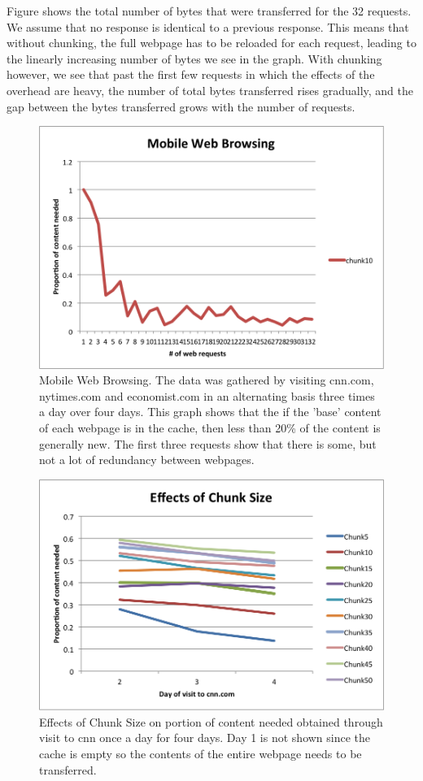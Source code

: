 Figure shows the total number of bytes that were transferred for the 32 requests. 
We assume that no response is identical to a previous response. 
This means that without chunking, the full webpage has to be reloaded for each request, leading to the linearly increasing number of bytes we see in the graph. 
With chunking however, we see that past the first few requests in which the effects of the overhead are heavy, the number of total bytes transferred rises gradually, and the gap between the bytes transferred grows with the number of requests.

\begin{figure}[h] 
\centering \includegraphics[scale=0.40]{images/browsing.png}
\caption{Mobile Web Browsing. The data was gathered by visiting cnn.com, nytimes.com and economist.com in an alternating basis three times a day over four days. This graph shows that the if the 'base' content of each webpage is in the cache, then less than 20\% of the content is generally new. The first three requests show that there is some, but not a lot of redundancy between webpages.}
\end{figure}

\begin{figure}[h] 
\centering \includegraphics[scale=0.40]{images/chunksize.png}
\caption{Effects of Chunk Size on portion of content needed obtained through visit to cnn once a day for four days. Day 1 is not shown since the cache is empty so the contents of the entire webpage needs to be transferred.}
\end{figure}

